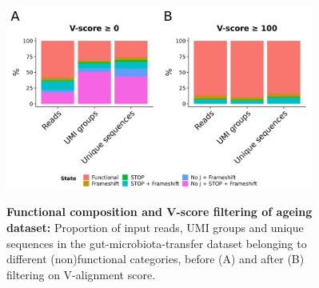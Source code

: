 \begin{figure}
\centering
\includegraphics[width = 0.9\textwidth]{_Figures/png/gut-functional-prop}
\begin{subfigure}{0em}
\label{fig:igseq-gut-functional-prop-pre}
\end{subfigure}
\begin{subfigure}{0em}
\label{fig:igseq-gut-functional-prop-post}
\end{subfigure}
\caption[Functional composition and V-score filtering of \igseq ageing dataset]{\textbf{Functional composition and V-score filtering of \igseq ageing dataset:} Proportion of input reads, UMI groups and unique sequences in the \igseq gut-microbiota-transfer dataset belonging to different (non)functional categories, before (A) and after (B) filtering on V-alignment score.}
\label{fig:igseq-gut-functional-prop}
\end{figure}

